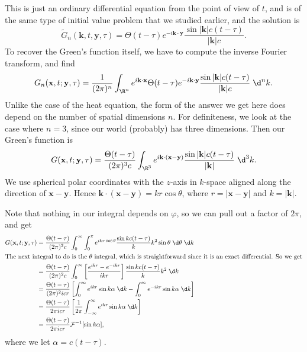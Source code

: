 \documentclass[a4paper]{article}
\begin{document}
This is just an ordinary differential equation from the point of view of $t$, and is of the same type of initial value problem that we studied earlier, and the solution is
\[
  \tilde{G}_n (\mathbf{k}, t, \mathbf{y}, \tau) = \Theta(t - \tau) e^{-i\mathbf{k} \cdot \mathbf{y}} \frac{\sin |\mathbf{k}| c (t - \tau)}{|\mathbf{k}| c}.
\]
To recover the Green's function itself, we have to compute the inverse Fourier transform, and find
\[
  G_n(\mathbf{x}, t; \mathbf{y}, \tau) = \frac{1}{(2\pi)^n} \int_{\R^n} e^{i\mathbf{k}\cdot \mathbf{x}} \Theta(t - \tau) e^{-i\mathbf{k}\cdot \mathbf{y}}\frac{\sin |\mathbf{k}| c(t - \tau)}{|\mathbf{k}| c} \;\d^n k.
\]
Unlike the case of the heat equation, the form of the answer we get here does depend on the number of spatial dimensions $n$. For definiteness, we look at the case where $n = 3$, since our world (probably) has three dimensions. Then our Green's function is
\[
  G(\mathbf{x}, t; \mathbf{y}, \tau) = \frac{\Theta(t - \tau)}{(2\pi)^3 c} \int_{\R^3} e^{i\mathbf{k}\cdot (\mathbf{x} - \mathbf{y})} \frac{\sin |\mathbf{k}|c(t - \tau)}{|\mathbf{k}|} \;\d^3 k.
\]
We use spherical polar coordinates with the $z$-axis in $k$-space aligned along the direction of $\mathbf{x} - \mathbf{y}$. Hence $\mathbf{k}\cdot (\mathbf{x} - \mathbf{y}) = kr \cos \theta$, where $r = |\mathbf{x} - \mathbf{y}|$ and $k = |\mathbf{k}|$.

Note that nothing in our integral depends on $\varphi$, so we can pull out a factor of $2\pi$, and get
\begin{align*}
  G(\mathbf{x}, t; \mathbf{y}, \tau) &= \frac{\Theta(t - \tau)}{(2 \pi)^2 c} \int_0^\infty \int_0^\pi e^{ik r\cos \theta} \frac{\sin kc(t - \tau)}{k} k^2 \sin \theta \;\d \theta \;\d k\\
  \intertext{The next integral to do is the $\theta$ integral, which is straightforward since it is an exact differential. So we get}
  &= \frac{\Theta(t - \tau)}{(2\pi)^2 c} \int_0^\infty \left[\frac{e^{ikr} - e^{-ikr}}{ikr}\right] \frac{\sin kc(t - \tau)}{k} k^2 \;\d k\\
  &= \frac{\Theta(t - \tau)}{(2\pi)^2 icr} \left[\int_0^\infty e^{ikr} \sin k\alpha\;\d k - \int_0^\infty e^{-ikr} \sin k\alpha\;\d k\right]\\
  &= \frac{\Theta(t - \tau)}{2\pi i c r} \left[\frac{1}{2\pi} \int_{-\infty}^\infty e^{ikr} \sin k\alpha \;\d k\right]\\
  &= \frac{\Theta(t - \tau)}{ 2\pi i c r} \mathcal{F}^{-1}[\sin k \alpha],
\end{align*}
where we let $\alpha = c(t - \tau)$.
\end{document}
